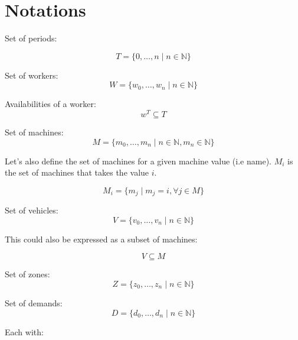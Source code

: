 \documentclass[../thesis.tex]{subfiles}
\begin{document}
\section{Notations}


Set of periods:

\begin{equation*}
    T = \{ 0, \dots, n \mid n \in \mathbb{N} \}
\end{equation*}

Set of workers:
\begin{equation*}
    W = \{ w_0, \dots, w_n \mid n \in \mathbb{N} \}
\end{equation*}

Availabilities of a worker:
\begin{equation*}
    w^T \subseteq T
\end{equation*}

Set of machines:
\begin{equation*}
    M = \{m_0, \dots, m_n \mid n \in \mathbb{N}, m_n \in \mathbb{N} \}
\end{equation*}

Let's also define the set of machines for a given machine value (i.e name). $M_i$ is the set of machines that takes the value $i$. 

\begin{equation*}
    M_i = \{m_j \mid m_j = i,  \forall j \in M\}
\end{equation*}





Set of vehicles:
\begin{equation*}
    V = \{v_0, \dots, v_n \mid n \in \mathbb{N} \}
\end{equation*}

This could also be expressed as a subset of machines:

\begin{equation*}
    V \subseteq M
\end{equation*}

Set of zones:
\begin{equation*}
    Z = \{z_0, \dots, z_n \mid n \in \mathbb{N} \}
\end{equation*}


Set of demands: 
\begin{equation*}
    D = \{ d_0, \dots, d_n \mid n \in \mathbb{N} \}
\end{equation*}

Each with: 
\end{document}
